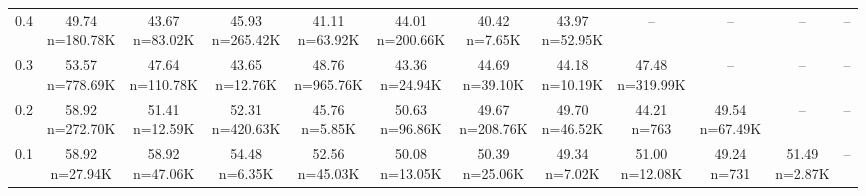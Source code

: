 \begin{table}
\begin{tabular}{lccccccccccc}
0.4 & \makecell{49.74 \\ \scriptsize n=180.78K} & \makecell{43.67 \\ \scriptsize n=83.02K} & \makecell{45.93 \\ \scriptsize n=265.42K} & \makecell{41.11 \\ \scriptsize n=63.92K} & \makecell{44.01 \\ \scriptsize n=200.66K} & \makecell{40.42 \\ \scriptsize n=7.65K} & \makecell{43.97 \\ \scriptsize n=52.95K} & -- & -- & -- & -- \\
0.3 & \makecell{53.57 \\ \scriptsize n=778.69K} & \makecell{47.64 \\ \scriptsize n=110.78K} & \makecell{43.65 \\ \scriptsize n=12.76K} & \makecell{48.76 \\ \scriptsize n=965.76K} & \makecell{43.36 \\ \scriptsize n=24.94K} & \makecell{44.69 \\ \scriptsize n=39.10K} & \makecell{44.18 \\ \scriptsize n=10.19K} & \makecell{47.48 \\ \scriptsize n=319.99K} & -- & -- & -- \\
0.2 & \makecell{58.92 \\ \scriptsize n=272.70K} & \makecell{51.41 \\ \scriptsize n=12.59K} & \makecell{52.31 \\ \scriptsize n=420.63K} & \makecell{45.76 \\ \scriptsize n=5.85K} & \makecell{50.63 \\ \scriptsize n=96.86K} & \makecell{49.67 \\ \scriptsize n=208.76K} & \makecell{49.70 \\ \scriptsize n=46.52K} & \makecell{44.21 \\ \scriptsize n=763} & \makecell{49.54 \\ \scriptsize n=67.49K} & -- & -- \\
0.1 & \makecell{58.92 \\ \scriptsize n=27.94K} & \makecell{58.92 \\ \scriptsize n=47.06K} & \makecell{54.48 \\ \scriptsize n=6.35K} & \makecell{52.56 \\ \scriptsize n=45.03K} & \makecell{50.08 \\ \scriptsize n=13.05K} & \makecell{50.39 \\ \scriptsize n=25.06K} & \makecell{49.34 \\ \scriptsize n=7.02K} & \makecell{51.00 \\ \scriptsize n=12.08K} & \makecell{49.24 \\ \scriptsize n=731} & \makecell{51.49 \\ \scriptsize n=2.87K} & -- \\

\end{tabular}
\end{table}
